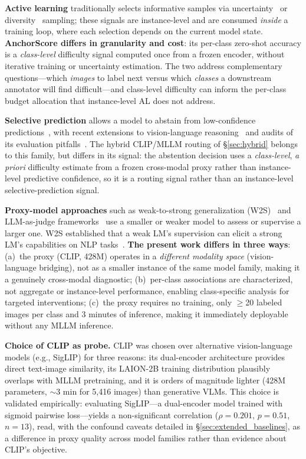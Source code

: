 \documentclass[a4paper,fleqn]{cas-sc}
\begin{document}
\textbf{Active learning} traditionally selects informative samples via uncertainty~\cite{settles2009active} or diversity~\cite{sener2018active} sampling; these signals are instance-level and are consumed \emph{inside} a training loop, where each selection depends on the current model state. \textbf{AnchorScore differs in granularity and cost}: its per-class zero-shot accuracy is a \emph{class-level} difficulty signal computed once from a frozen encoder, without iterative training or uncertainty estimation. The two address complementary questions---which \emph{images} to label next versus which \emph{classes} a downstream annotator will find difficult---and class-level difficulty can inform the per-class budget allocation that instance-level AL does not address.

\textbf{Selective prediction} allows a model to abstain from low-confidence predictions~\cite{geifman2017selective, elyaniv2010foundations}, with recent extensions to vision-language reasoning~\cite{srinivasan2024selective} and audits of its evaluation pitfalls~\cite{luth2024overcoming}. The hybrid CLIP/MLLM routing of \S\ref{sec:hybrid} belongs to this family, but differs in its signal: the abstention decision uses a \emph{class-level}, \emph{a priori} difficulty estimate from a frozen cross-modal proxy rather than instance-level predictive confidence, so it is a routing signal rather than an instance-level selective-prediction signal.

\textbf{Proxy-model approaches} such as weak-to-strong generalization (W2S)~\cite{burns2023weak} and LLM-as-judge frameworks~\cite{dubois2024lengthcontrolled, zheng2023judging} use a smaller or weaker model to assess or supervise a larger one. W2S established that a weak LM's supervision can elicit a strong LM's capabilities on NLP tasks~\cite{burns2023weak}. \textbf{The present work differs in three ways}: (a)~the proxy (CLIP, 428M) operates in a \emph{different modality space} (vision-language bridging), not as a smaller instance of the same model family, making it a genuinely cross-modal diagnostic; (b)~per-class associations are characterized, not aggregate or instance-level performance, enabling class-specific analysis for targeted interventions; (c)~the proxy requires no training, only $\geq$20 labeled images per class and 3 minutes of inference, making it immediately deployable without any MLLM inference.

\textbf{Choice of CLIP as probe.} CLIP was chosen over alternative vision-language models (e.g., SigLIP) for three reasons: its dual-encoder architecture provides direct text-image similarity, its LAION-2B training distribution plausibly overlaps with MLLM pretraining, and it is orders of magnitude lighter (428M parameters, $\sim$3 min for 5{,}416 images) than generative VLMs. This choice is validated empirically: evaluating SigLIP---a dual-encoder model trained with sigmoid pairwise loss---yields a non-significant correlation ($\rho=0.201$, $p=0.51$, $n=13$), read, with the confound caveats detailed in \S\ref{sec:extended_baselines}, as a difference in proxy quality across model families rather than evidence about CLIP's objective.
\end{document}
